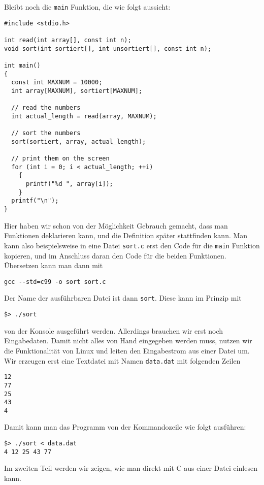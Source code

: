 Bleibt noch die \verb|main| Funktion, die wie folgt aussieht:
\begin{lstlisting}
#include <stdio.h>

int read(int array[], const int n);
void sort(int sortiert[], int unsortiert[], const int n);

int main()
{
  const int MAXNUM = 10000;
  int array[MAXNUM], sortiert[MAXNUM];

  // read the numbers
  int actual_length = read(array, MAXNUM);

  // sort the numbers
  sort(sortiert, array, actual_length);

  // print them on the screen
  for (int i = 0; i < actual_length; ++i)
    {
      printf("%d ", array[i]);
    }
  printf("\n");
}
\end{lstlisting}
Hier haben wir schon von der Möglichkeit Gebrauch gemacht, dass man Funktionen deklarieren kann, und die Definition später stattfinden kann.
Man kann also beispielsweise in eine Datei \verb|sort.c| erst den Code für die \verb|main| Funktion kopieren, und im Anschluss daran den Code für die beiden Funktionen.
Übersetzen kann man dann mit
\begin{verbatim}
gcc --std=c99 -o sort sort.c
\end{verbatim}
Der Name der ausführbaren Datei ist dann \verb|sort|.
Diese kann im Prinzip mit
\begin{verbatim}
$> ./sort
\end{verbatim}
von der Konsole ausgeführt werden.
Allerdings brauchen wir erst noch Eingabedaten.
Damit nicht alles von Hand eingegeben werden muss, nutzen wir die Funktionalität von Linux und leiten den Eingabestrom aus einer Datei um.
Wir erzeugen erst eine Textdatei mit Namen \verb|data.dat| mit folgenden Zeilen
\begin{lstlisting}
12
77
25
43
4
\end{lstlisting}
Damit kann man das Programm von der Kommandozeile wie folgt ausführen:
\begin{verbatim}
$> ./sort < data.dat
4 12 25 43 77
\end{verbatim}
Im zweiten Teil werden wir zeigen, wie man direkt mit C aus einer Datei einlesen kann.

\endinput
